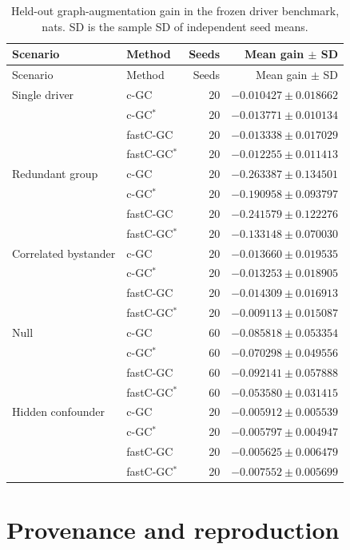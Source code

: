 \documentclass[11pt,a4paper]{article}
\newcommand{\cgc}{c-GC}
\newcommand{\cgcs}{c-GC$^{*}$}
\newcommand{\fastcgc}{fastC-GC}
\newcommand{\fastcgcs}{fastC-GC$^{*}$}
\begin{document}
\begin{longtable}{@{}llrr@{}}
\caption{Held-out graph-augmentation gain in the frozen driver benchmark, nats.
SD is the sample SD of independent seed means.}\label{tab:drivergains}\\
\toprule
Scenario & Method & Seeds & Mean gain $\pm$ SD \\
\midrule
\endfirsthead
\toprule
Scenario & Method & Seeds & Mean gain $\pm$ SD \\
\midrule
\endhead
Single driver & \cgc & 20 & $-0.010427 \pm 0.018662$ \\
 & \cgcs & 20 & $-0.013771 \pm 0.010134$ \\
 & \fastcgc & 20 & $-0.013338 \pm 0.017029$ \\
 & \fastcgcs & 20 & $-0.012255 \pm 0.011413$ \\
\midrule
Redundant group & \cgc & 20 & $-0.263387 \pm 0.134501$ \\
 & \cgcs & 20 & $-0.190958 \pm 0.093797$ \\
 & \fastcgc & 20 & $-0.241579 \pm 0.122276$ \\
 & \fastcgcs & 20 & $-0.133148 \pm 0.070030$ \\
\midrule
Correlated bystander & \cgc & 20 & $-0.013660 \pm 0.019535$ \\
 & \cgcs & 20 & $-0.013253 \pm 0.018905$ \\
 & \fastcgc & 20 & $-0.014309 \pm 0.016913$ \\
 & \fastcgcs & 20 & $-0.009113 \pm 0.015087$ \\
\midrule
Null & \cgc & 60 & $-0.085818 \pm 0.053354$ \\
 & \cgcs & 60 & $-0.070298 \pm 0.049556$ \\
 & \fastcgc & 60 & $-0.092141 \pm 0.057888$ \\
 & \fastcgcs & 60 & $-0.053580 \pm 0.031415$ \\
\midrule
Hidden confounder & \cgc & 20 & $-0.005912 \pm 0.005539$ \\
 & \cgcs & 20 & $-0.005797 \pm 0.004947$ \\
 & \fastcgc & 20 & $-0.005625 \pm 0.006479$ \\
 & \fastcgcs & 20 & $-0.007552 \pm 0.005699$ \\
\bottomrule
\end{longtable}

\section{Provenance and reproduction}
\label{app:provenance}
\end{document}
